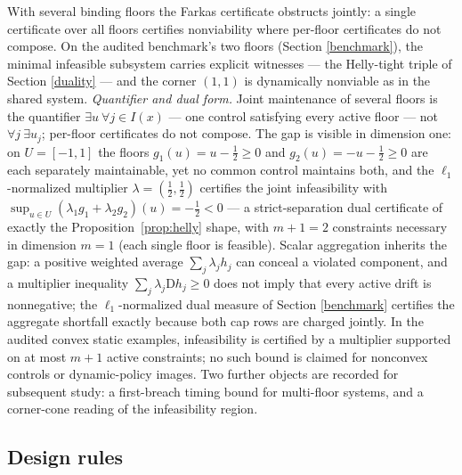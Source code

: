 \documentclass[10pt,twocolumn]{article}
\theoremstyle{definition}
\begin{document}
With several binding floors the Farkas certificate obstructs jointly: a
single certificate over all floors certifies nonviability where
per-floor certificates do not compose. On the audited benchmark's two
floors (Section \ref{benchmark}), the minimal infeasible subsystem
carries explicit witnesses --- the Helly-tight triple of Section
\ref{duality} --- and the corner \((1,1)\) is dynamically nonviable
as in the shared system. \emph{Quantifier and dual form.} Joint maintenance of several floors is the quantifier \(\exists u\ \forall j \in I(x)\) --- one control satisfying every active floor --- not \(\forall j\ \exists u_j\); per-floor certificates do not compose. The gap is visible in dimension one: on \(U = [-1, 1]\) the floors \(g_1(u) = u - \tfrac12 \ge 0\) and \(g_2(u) = -u - \tfrac12 \ge 0\) are each separately maintainable, yet no common control maintains both, and the \(\ell_1\)-normalized multiplier \(\lambda = (\tfrac12, \tfrac12)\) certifies the joint infeasibility with \(\sup_{u \in U}(\lambda_1 g_1 + \lambda_2 g_2)(u) = -\tfrac12 < 0\) --- a strict-separation dual certificate of exactly the Proposition~\ref{prop:helly} shape, with \(m + 1 = 2\) constraints necessary in dimension \(m = 1\) (each single floor is feasible). Scalar aggregation inherits the gap: a positive weighted average \(\sum_j \lambda_j h_j\) can conceal a violated component, and a multiplier inequality \(\sum_j \lambda_j \mathrm{D}h_j \ge 0\) does not imply that every active drift is nonnegative; the \(\ell_1\)-normalized dual measure of Section \ref{benchmark} certifies the aggregate shortfall exactly because both cap rows are charged jointly. In the audited convex static examples, infeasibility is certified by a multiplier supported on at most \(m + 1\) active constraints; no such bound is claimed for nonconvex controls or dynamic-policy images. Two further objects are recorded for subsequent study: a
first-breach timing bound for multi-floor systems, and a corner-cone
reading of the infeasibility region.

\subsection{Design rules}\label{rules}
\end{document}
